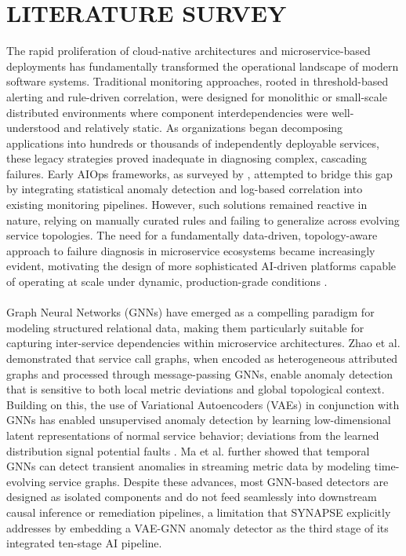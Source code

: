 
\section{LITERATURE SURVEY}

\hspace*{0.3in} The rapid proliferation of cloud-native architectures and microservice-based deployments has fundamentally transformed the operational landscape of modern software systems. Traditional monitoring approaches, rooted in threshold-based alerting and rule-driven correlation, were designed for monolithic or small-scale distributed environments where component interdependencies were well-understood and relatively static. As organizations began decomposing applications into hundreds or thousands of independently deployable services, these legacy strategies proved inadequate in diagnosing complex, cascading failures. Early AIOps frameworks, as surveyed by \cite{dang2019aiops}, attempted to bridge this gap by integrating statistical anomaly detection and log-based correlation into existing monitoring pipelines. However, such solutions remained reactive in nature, relying on manually curated rules and failing to generalize across evolving service topologies. The need for a fundamentally data-driven, topology-aware approach to failure diagnosis in microservice ecosystems became increasingly evident, motivating the design of more sophisticated AI-driven platforms capable of operating at scale under dynamic, production-grade conditions \cite{chen2020towards}.\\\\

\hspace*{0.3in} Graph Neural Networks (GNNs) have emerged as a compelling paradigm for modeling structured relational data, making them particularly suitable for capturing inter-service dependencies within microservice architectures. Zhao et al. \cite{zhao2021graph} demonstrated that service call graphs, when encoded as heterogeneous attributed graphs and processed through message-passing GNNs, enable anomaly detection that is sensitive to both local metric deviations and global topological context. Building on this, the use of Variational Autoencoders (VAEs) in conjunction with GNNs has enabled unsupervised anomaly detection by learning low-dimensional latent representations of normal service behavior; deviations from the learned distribution signal potential faults \cite{li2022vae}. Ma et al. \cite{ma2023gnn} further showed that temporal GNNs can detect transient anomalies in streaming metric data by modeling time-evolving service graphs. Despite these advances, most GNN-based detectors are designed as isolated components and do not feed seamlessly into downstream causal inference or remediation pipelines, a limitation that SYNAPSE explicitly addresses by embedding a VAE-GNN anomaly detector as the third stage of its integrated ten-stage AI pipeline.\\\\

